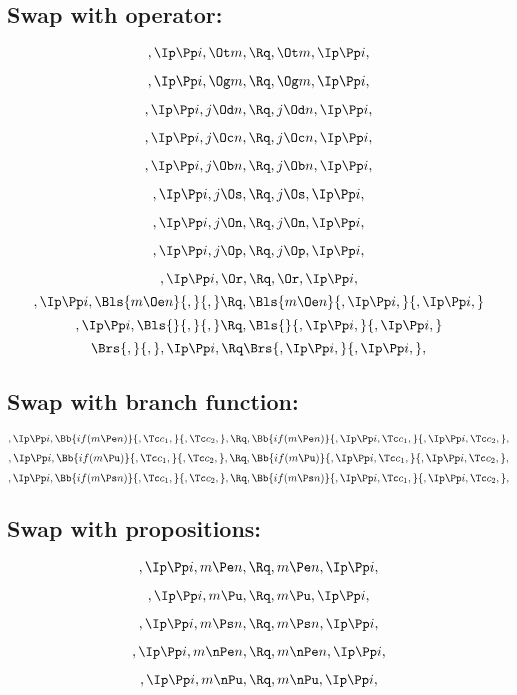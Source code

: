 \bigskip
\bigskip
\subsection{Swap with  operator:}
\[,\Ip \Pp i, \Ot m, \Rq , \Ot m, \Ip \Pp i,\]

\[,\Ip \Pp i, \Og m, \Rq , \Og m, \Ip \Pp i,\]

\[,\Ip \Pp i, j \Od n, \Rq , j \Od n, \Ip \Pp i,\]

\[,\Ip \Pp i, j \Oc n, \Rq , j \Oc n, \Ip \Pp i,\]

\[,\Ip \Pp i, j \Ob n, \Rq , j \Ob n, \Ip \Pp i,\]

\[,\Ip \Pp i, j \Os, \Rq , j \Os, \Ip \Pp i,\]

\[,\Ip \Pp i, j \On, \Rq , j \On, \Ip \Pp i,\]

\[,\Ip \Pp i, j \Op, \Rq , j \Op, \Ip \Pp i,\]

\[,\Ip \Pp i, \Or, \Rq , \Or, \Ip \Pp i,\]
\bigskip
\[,\Ip \Pp i, \Bls{m \Oe n}{,}{,} \Rq , \Bls{m \Oe n}{,\Ip \Pp i,}{,\Ip \Pp i,}\]
\bigskip
\[,\Ip \Pp i, \Bls{}{,}{,} \Rq , \Bls{}{,\Ip \Pp i,}{,\Ip \Pp i,}\]
\bigskip
\[ \Brs{,}{,},\Ip \Pp i, \Rq \Brs{,\Ip \Pp i,}{,\Ip \Pp i,},\]



\bigskip
\bigskip
\subsection{Swap with branch function:}
\[,\Ip \Pp i, \Bb{if(m \Pe n)}{,\Tc c_1,}{,\Tc c_2,}, \Rq , \Bb{if(m \Pe n)}{,\Ip \Pp i, \Tc c_1,}{,\Ip \Pp i, \Tc c_2,},\]
\bigskip
\bigskip
\[,\Ip \Pp i, \Bb{if(m \Pu)}{,\Tc c_1,}{,\Tc c_2,}, \Rq , \Bb{if(m \Pu)}{,\Ip \Pp i, \Tc c_1,}{,\Ip \Pp i, \Tc c_2,},\]
\bigskip
\bigskip
\[,\Ip \Pp i, \Bb{if(m \Ps n)}{,\Tc c_1,}{,\Tc c_2,}, \Rq , \Bb{if(m \Ps n)}{,\Ip \Pp i, \Tc c_1,}{,\Ip \Pp i, \Tc c_2,},\]


\bigskip
\bigskip
\subsection{Swap with propositions:}
\[,\Ip \Pp i, m \Pe n, \Rq , m \Pe n, \Ip \Pp i,\]

\[,\Ip \Pp i, m \Pu, \Rq , m \Pu, \Ip \Pp i,\]

\[,\Ip \Pp i, m \Ps n, \Rq , m \Ps n, \Ip \Pp i,\]

\[,\Ip \Pp i, m \nPe n, \Rq , m \nPe n, \Ip \Pp i,\]

\[,\Ip \Pp i, m \nPu, \Rq , m \nPu, \Ip \Pp i,\]

